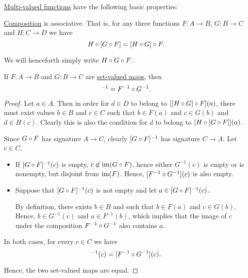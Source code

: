 \begin{proposition}\label{thm:def:set_valued_map}
  \hyperref[def:set_valued_map]{Multi-valued functions} have the following basic properties:

  \begin{thmenum}
     \hyperref[def:set_valued_map/composition]{Composition} is associative. That is, for any three functions \( F: A \to B \), \( G: B \to C \) and \( H: C \to D \) we have
    \begin{equation*}
      H \bincirc [G \bincirc F] = [H \bincirc G] \bincirc F.
    \end{equation*}

    We will henceforth simply write \( H \bincirc G \bincirc F \).

     If \( F: A \to B \) and \( G: B \to C \) are \hyperref[def:function]{set-valued maps}, then
    \begin{equation*}
      [G \bincirc F]^{-1} = F^{-1} \bincirc G^{-1}.
    \end{equation*}
  \end{thmenum}
\end{proposition}
\begin{proof}
   Let \( a \in A \). Then in order for \( d \in D \) to belong to \( [[H \bincirc G] \bincirc F](a) \), there must exist values \( b \in B \) and \( c \in C \) such that \( b \in F(a) \) and \( c \in G(b) \) and \( d \in H(c) \). Clearly this is also the condition for \( d \) to belong to \( [H \bincirc [G \bincirc F]](a) \).

   Since \( G \bincirc F \) has signature \( A \to C \), clearly \( [G \bincirc F]^{-1} \) has signature \( C \to A \). Let \( c \in C \).

  \begin{itemize}
    \item If \( [G \bincirc F]^{-1}(c) \) is empty, \( c \not\in \img(G \bincirc F) \), hence either \( G^{-1}(c) \) is empty or is nonempty, but disjoint from \( \operatorname{im}(F) \). Hence, \( [F^{-1} \bincirc G^{-1}](c) \) is also empty.

    \item Suppose that \( [G \bincirc F]^{-1}(c) \) is not empty and let \( a \in [G \bincirc F]^{-1}(c) \).

    By definition, there exists \( b \in B \) and such that \( b \in F(a) \) and \( c \in G(b) \). Hence, \( b \in G^{-1}(c) \) and \( a \in F^{-1}(b) \), which implies that the image of \( c \) under the composition \( F^{-1} \bincirc G^{-1} \) also contains \( a \).
  \end{itemize}

  In both cases, for every \( c \in C \) we have
  \begin{equation*}
    [G \bincirc F]^{-1}(c) = [F^{-1} \bincirc G^{-1}](c).
  \end{equation*}

  Hence, the two set-valued maps are equal.
\end{proof}

